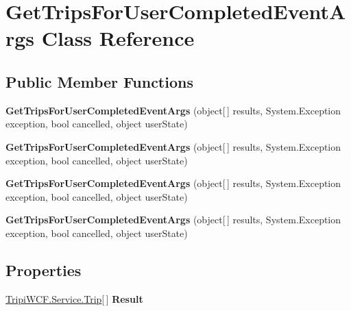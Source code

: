 \hypertarget{class_get_trips_for_user_completed_event_args}{
\section{GetTripsForUserCompletedEventArgs Class Reference}
\label{class_get_trips_for_user_completed_event_args}
}
\subsection*{Public Member Functions}
\begin{DoxyCompactItemize}
\item 
\hypertarget{class_get_trips_for_user_completed_event_args_a8e005ea856b1f726b4a2de298c5005a3}{
{\bfseries GetTripsForUserCompletedEventArgs} (object\mbox{[}$\,$\mbox{]} results, System.Exception exception, bool cancelled, object userState)}
\label{class_get_trips_for_user_completed_event_args_a8e005ea856b1f726b4a2de298c5005a3}

\item 
\hypertarget{class_get_trips_for_user_completed_event_args_a8e005ea856b1f726b4a2de298c5005a3}{
{\bfseries GetTripsForUserCompletedEventArgs} (object\mbox{[}$\,$\mbox{]} results, System.Exception exception, bool cancelled, object userState)}
\label{class_get_trips_for_user_completed_event_args_a8e005ea856b1f726b4a2de298c5005a3}

\item 
\hypertarget{class_get_trips_for_user_completed_event_args_a8e005ea856b1f726b4a2de298c5005a3}{
{\bfseries GetTripsForUserCompletedEventArgs} (object\mbox{[}$\,$\mbox{]} results, System.Exception exception, bool cancelled, object userState)}
\label{class_get_trips_for_user_completed_event_args_a8e005ea856b1f726b4a2de298c5005a3}

\item 
\hypertarget{class_get_trips_for_user_completed_event_args_a8e005ea856b1f726b4a2de298c5005a3}{
{\bfseries GetTripsForUserCompletedEventArgs} (object\mbox{[}$\,$\mbox{]} results, System.Exception exception, bool cancelled, object userState)}
\label{class_get_trips_for_user_completed_event_args_a8e005ea856b1f726b4a2de298c5005a3}

\end{DoxyCompactItemize}
\subsection*{Properties}
\begin{DoxyCompactItemize}
\item 
\hypertarget{class_get_trips_for_user_completed_event_args_a72023686be6f87502c928452311f196b}{
\hyperlink{class_tripi_w_c_f_1_1_service_1_1_trip}{TripiWCF.Service.Trip}\mbox{[}$\,$\mbox{]} {\bfseries Result}}
\label{class_get_trips_for_user_completed_event_args_a72023686be6f87502c928452311f196b}

\end{DoxyCompactItemize}


